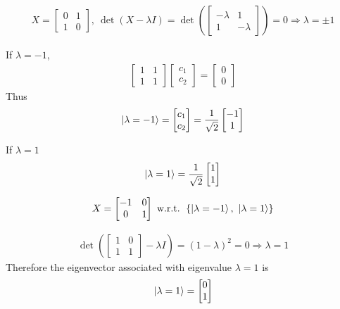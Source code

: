 \begin{align*}
	X = \begin{bmatrix}
	0 & 1 \\
	1 & 0
	\end{bmatrix},\ \det(X-\lambda I) =
	\det \left(\begin{bmatrix}
	-\lambda & 1 \\
	1 & -\lambda
	\end{bmatrix} \right) = 0 \Rightarrow \lambda = \pm 1
\end{align*}

If $\lambda = -1$,
\begin{align*}
	\begin{bmatrix}
		1 & 1 \\
		1 & 1
	\end{bmatrix}
	\begin{bmatrix}
		c_1 \\
		c_2
	\end{bmatrix} =
	\begin{bmatrix}
		0 \\
		0
	\end{bmatrix}
\end{align*}
Thus
\begin{align*}
	\ket{\lambda = -1} = \begin{bmatrix}
	c_1 \\
	c_2
	\end{bmatrix} = \frac{1}{\sqrt{2}}
	\begin{bmatrix}
	-1 \\
	1
	\end{bmatrix}
\end{align*}

If $\lambda = 1$
\begin{align*}
	\ket{\lambda = 1} = \frac{1}{\sqrt{2}}
	\begin{bmatrix}
	1 \\
	1
	\end{bmatrix}
\end{align*}

\begin{align*}
	X = \begin{bmatrix}
	-1 & 0 \\
	0 & 1
	\end{bmatrix}
	\text{ w.r.t. } \left\{ \ket{\lambda = -1},\ \ket{\lambda = 1}\right\}
\end{align*}



\begin{align*}
	\det \left(\begin{bmatrix}
	1 & 0 \\
	1 & 1
	\end{bmatrix} - \lambda I \right) = (1 - \lambda)^2 = 0 \Rightarrow \lambda = 1
\end{align*}
Therefore the eigenvector associated with eigenvalue $\lambda = 1$ is
\begin{align*}
	\ket{\lambda = 1} = \begin{bmatrix}
	0 \\
	1
	\end{bmatrix}
\end{align*}

